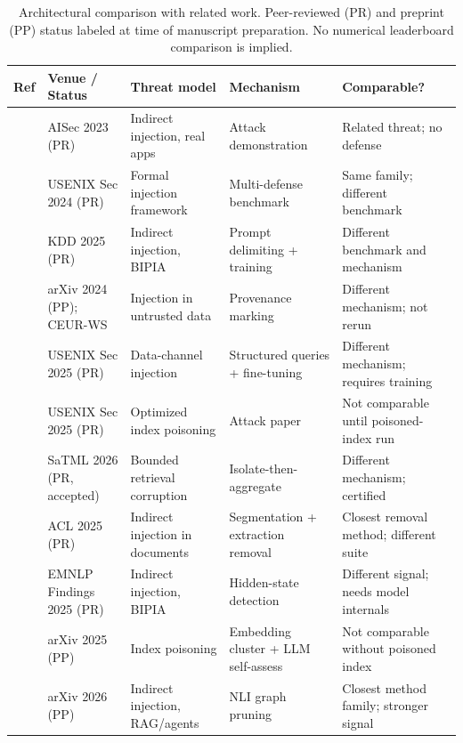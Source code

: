\documentclass[journal]{IEEEtran}
\begin{document}
\begin{table}[!t]
\centering
\caption{Architectural comparison with related work. Peer-reviewed (PR) and
  preprint (PP) status labeled at time of manuscript preparation.
  No numerical leaderboard comparison is implied.}
\label{tab:comparison}
\begin{tabular}{@{}lllll@{}}
\toprule
Ref & Venue / Status & Threat model & Mechanism & Comparable? \\
\midrule
\cite{greshake2023indirect} & AISec 2023 (PR) & Indirect injection, real apps & Attack demonstration & Related threat; no defense \\
\cite{liu2024formalizing} & USENIX Sec 2024 (PR) & Formal injection framework & Multi-defense benchmark & Same family; different benchmark \\
\cite{yi2025bipia} & KDD 2025 (PR) & Indirect injection, BIPIA & Prompt delimiting + training & Different benchmark and mechanism \\
\cite{hines2024spotlighting} & arXiv 2024 (PP); CEUR-WS & Injection in untrusted data & Provenance marking & Different mechanism; not rerun \\
\cite{chen2025struq} & USENIX Sec 2025 (PR) & Data-channel injection & Structured queries + fine-tuning & Different mechanism; requires training \\
\cite{zou2025poisonedrag} & USENIX Sec 2025 (PR) & Optimized index poisoning & Attack paper & Not comparable until poisoned-index run \\
\cite{xiang2026robustrag} & SaTML 2026 (PR, accepted) & Bounded retrieval corruption & Isolate-then-aggregate & Different mechanism; certified \\
\cite{chen2025detecting} & ACL 2025 (PR) & Indirect injection in documents & Segmentation + extraction removal & Closest removal method; different suite \\
\cite{wen2025instructdetector} & EMNLP Findings 2025 (PR) & Indirect injection, BIPIA & Hidden-state detection & Different signal; needs model internals \\
\cite{zhou2025trustrag} & arXiv 2025 (PP) & Index poisoning & Embedding cluster + LLM self-assess & Not comparable without poisoned index \\
\cite{datta2026sonar} & arXiv 2026 (PP) & Indirect injection, RAG/agents & NLI graph pruning & Closest method family; stronger signal \\
\bottomrule
\end{tabular}
\end{table}
\end{document}
